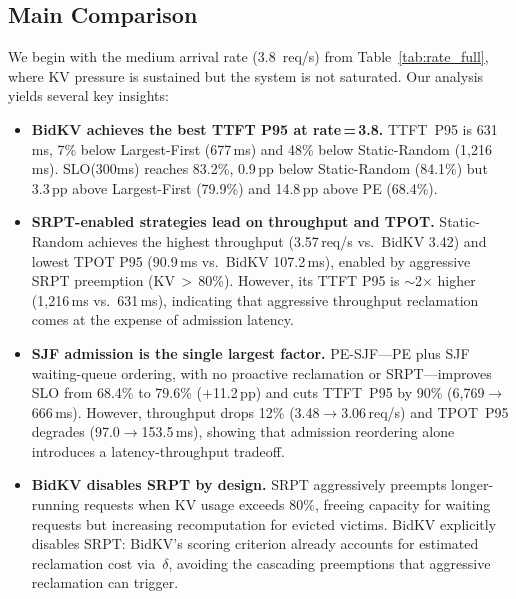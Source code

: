 \documentclass[sigconf,nonacm]{acmart}
\newcommand{\bidkv}{BidKV\xspace}
\newcommand{\qualdelta}{\ensuremath{\delta}}
\begin{document}
\subsection{Main Comparison}\label{sec:eval:main}

We begin with the medium arrival rate (3.8~req/s) from
Table~\ref{tab:rate_full}, where KV pressure is sustained but the system is
not saturated. Our analysis yields several key insights:

\begin{itemize}[leftmargin=*,nosep]
\item \textbf{\bidkv achieves the best TTFT P95 at rate\,=\,3.8.}
  TTFT~P95 is 631\,ms, 7\% below Largest-First (677\,ms) and
  48\% below Static-Random (1{,}216\,ms).  SLO(300ms) reaches 83.2\%,
  0.9\,pp below Static-Random (84.1\%) but 3.3\,pp above Largest-First
  (79.9\%) and 14.8\,pp above PE (68.4\%).

\item \textbf{SRPT-enabled strategies lead on throughput and TPOT.}
  Static-Random achieves the highest throughput (3.57\,req/s vs.\ \bidkv
  3.42) and lowest TPOT P95 (90.9\,ms vs.\ \bidkv 107.2\,ms), enabled by
  aggressive SRPT preemption (KV\,$>$\,80\%).  However, its TTFT P95 is
  ${\sim}$2$\times$ higher (1{,}216\,ms vs.\ 631\,ms), indicating that
  aggressive throughput reclamation comes at the expense of admission latency.

\item \textbf{SJF admission is the single largest factor.}
  PE-SJF---PE plus SJF waiting-queue ordering, with no proactive reclamation
  or SRPT---improves SLO from 68.4\% to 79.6\% ($+$11.2\,pp) and cuts
  TTFT~P95 by 90\% (6{,}769$\to$666\,ms).  However, throughput drops 12\%
  (3.48$\to$3.06\,req/s) and TPOT~P95 degrades (97.0$\to$153.5\,ms),
  showing that admission reordering alone introduces a
  latency-throughput tradeoff.

\item \textbf{\bidkv disables SRPT by design.}
  SRPT aggressively preempts longer-running requests when KV usage
  exceeds 80\%, freeing capacity for waiting requests but increasing
  recomputation for evicted victims.  \bidkv explicitly disables SRPT:
  BidKV's scoring criterion already accounts for estimated reclamation cost
  via~$\qualdelta$, avoiding the cascading preemptions that aggressive
  reclamation can trigger.
\end{itemize}
\end{document}
